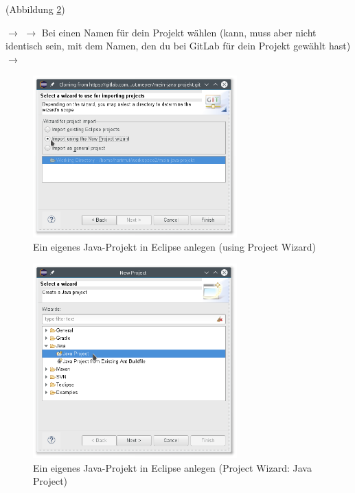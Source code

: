 (Abbildung \ref{fig:import-project-from-git-using-wizard-2})

$\rightarrow$   $\rightarrow$ Bei  einen Namen
für dein Projekt wählen (kann, muss aber nicht identisch sein, mit dem Namen,
den du bei GitLab für dein Projekt gewählt hast)  $\rightarrow$

\begin{figure}[h]
  \centering
   \includegraphics[width=0.70\textwidth]{./inf/SEKII/01_Vorbereitung/Import_Project_from_Git_using_Project_Wizard_1.png}
   \caption{Ein eigenes Java-Projekt in Eclipse anlegen (using Project Wizard)}
   \label{fig:import-project-from-git-using-wizard-1}
\end{figure}

\begin{figure}[h]
  \centering
   \includegraphics[width=0.70\textwidth]{./inf/SEKII/01_Vorbereitung/Import_Project_from_Git_using_Project_Wizard_2.png}
   \caption{Ein eigenes Java-Projekt in Eclipse anlegen (Project Wizard: Java Project)}
   \label{fig:import-project-from-git-using-wizard-2}
\end{figure}

